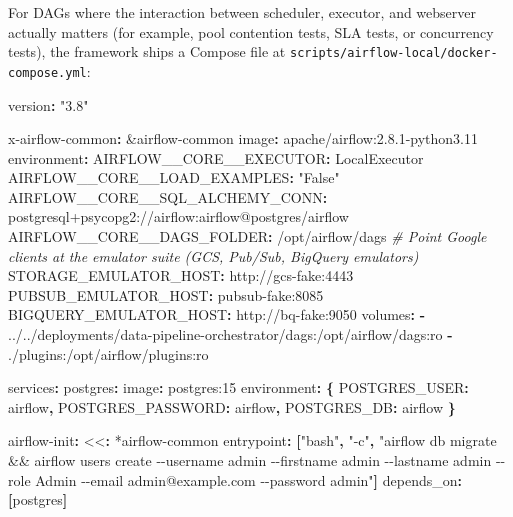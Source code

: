 \documentclass[
  11pt,
  british,
  oneside]{book}
\newenvironment{Shaded}{\begin{snugshade}}{\end{snugshade}}
\newcommand{\AttributeTok}[1]{\textcolor[rgb]{0.77,0.63,0.00}{#1}}
\newcommand{\CommentTok}[1]{\textcolor[rgb]{0.56,0.35,0.01}{\textit{#1}}}
\newcommand{\FunctionTok}[1]{\textcolor[rgb]{0.00,0.00,0.00}{#1}}
\newcommand{\KeywordTok}[1]{\textcolor[rgb]{0.13,0.29,0.53}{\textbf{#1}}}
\newcommand{\OtherTok}[1]{\textcolor[rgb]{0.56,0.35,0.01}{#1}}
\newcommand{\StringTok}[1]{\textcolor[rgb]{0.31,0.60,0.02}{#1}}
\begin{document}
For DAGs where the interaction between scheduler, executor, and
webserver actually matters (for example, pool contention tests, SLA
tests, or concurrency tests), the framework ships a Compose file at
\texttt{scripts/airflow-local/docker-compose.yml}:

\begin{Shaded}
\begin{Highlighting}[]
\FunctionTok{version}\KeywordTok{:}\AttributeTok{ }\StringTok{"3.8"}

\FunctionTok{x{-}airflow{-}common}\KeywordTok{:}\AttributeTok{ }\OtherTok{\&airflow{-}common}
\AttributeTok{  }\FunctionTok{image}\KeywordTok{:}\AttributeTok{ apache/airflow:2.8.1{-}python3.11}
\AttributeTok{  }\FunctionTok{environment}\KeywordTok{:}
\AttributeTok{    }\FunctionTok{AIRFLOW\_\_CORE\_\_EXECUTOR}\KeywordTok{:}\AttributeTok{ LocalExecutor}
\AttributeTok{    }\FunctionTok{AIRFLOW\_\_CORE\_\_LOAD\_EXAMPLES}\KeywordTok{:}\AttributeTok{ }\StringTok{"False"}
\AttributeTok{    }\FunctionTok{AIRFLOW\_\_CORE\_\_SQL\_ALCHEMY\_CONN}\KeywordTok{:}\AttributeTok{ postgresql+psycopg2://airflow:airflow@postgres/airflow}
\AttributeTok{    }\FunctionTok{AIRFLOW\_\_CORE\_\_DAGS\_FOLDER}\KeywordTok{:}\AttributeTok{ /opt/airflow/dags}
\CommentTok{    \# Point Google clients at the emulator suite (GCS, Pub/Sub, BigQuery emulators)}
\AttributeTok{    }\FunctionTok{STORAGE\_EMULATOR\_HOST}\KeywordTok{:}\AttributeTok{ http://gcs{-}fake:4443}
\AttributeTok{    }\FunctionTok{PUBSUB\_EMULATOR\_HOST}\KeywordTok{:}\AttributeTok{ pubsub{-}fake:8085}
\AttributeTok{    }\FunctionTok{BIGQUERY\_EMULATOR\_HOST}\KeywordTok{:}\AttributeTok{ http://bq{-}fake:9050}
\AttributeTok{  }\FunctionTok{volumes}\KeywordTok{:}
\AttributeTok{    }\KeywordTok{{-}}\AttributeTok{ ../../deployments/data{-}pipeline{-}orchestrator/dags:/opt/airflow/dags:ro}
\AttributeTok{    }\KeywordTok{{-}}\AttributeTok{ ./plugins:/opt/airflow/plugins:ro}

\FunctionTok{services}\KeywordTok{:}
\AttributeTok{  }\FunctionTok{postgres}\KeywordTok{:}
\AttributeTok{    }\FunctionTok{image}\KeywordTok{:}\AttributeTok{ postgres:15}
\AttributeTok{    }\FunctionTok{environment}\KeywordTok{:}\AttributeTok{ }\KeywordTok{\{}\AttributeTok{ }\FunctionTok{POSTGRES\_USER}\KeywordTok{:}\AttributeTok{ airflow}\KeywordTok{,}\AttributeTok{ }\FunctionTok{POSTGRES\_PASSWORD}\KeywordTok{:}\AttributeTok{ airflow}\KeywordTok{,}\AttributeTok{ }\FunctionTok{POSTGRES\_DB}\KeywordTok{:}\AttributeTok{ airflow }\KeywordTok{\}}

\AttributeTok{  }\FunctionTok{airflow{-}init}\KeywordTok{:}
\AttributeTok{    }\FunctionTok{\textless{}\textless{}}\KeywordTok{:}\AttributeTok{ }\OtherTok{*airflow{-}common}
\AttributeTok{    }\FunctionTok{entrypoint}\KeywordTok{:}\AttributeTok{ }\KeywordTok{[}\StringTok{"bash"}\KeywordTok{,}\AttributeTok{ }\StringTok{"{-}c"}\KeywordTok{,}\AttributeTok{ }\StringTok{"airflow db migrate \&\& airflow users create {-}{-}username admin {-}{-}firstname admin {-}{-}lastname admin {-}{-}role Admin {-}{-}email admin@example.com {-}{-}password admin"}\KeywordTok{]}
\AttributeTok{    }\FunctionTok{depends\_on}\KeywordTok{:}\AttributeTok{ }\KeywordTok{[}\AttributeTok{postgres}\KeywordTok{]}


\end{Highlighting}
\end{Shaded}
\end{document}
